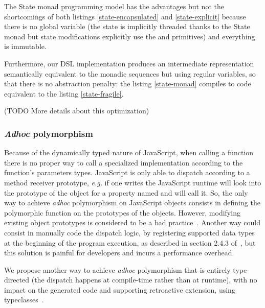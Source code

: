 \documentclass[american,english,runningheads]{llncs}
\newcommand{\eg}{\emph{e.g.}}
\begin{document}
The State monad programming model has the advantages but not the shortcomings of both listings \ref{state-encapsulated} and \ref{state-explicit} because there is no global variable (the state is implicitly threaded thanks to the State monad but state modifications explicitly use the  and  primitives) and everything is immutable.

Furthermore, our DSL implementation produces an intermediate representation semantically equivalent to the monadic sequences but using regular variables, so that there is no abstraction penalty: the listing \ref{state-monad} compiles to code equivalent to the listing \ref{state-fragile}.

(TODO More details about this optimization)

\subsubsection{\emph{Adhoc} polymorphism}

Because of the dynamically typed nature of JavaScript, when calling a function there is no proper way to call a specialized implementation according to the function’s parameters types. JavaScript is only able to dispatch according to a method receiver prototype, \eg{} if one writes  the JavaScript runtime will look into the prototype of the  object for a property named  and will call it. So, the only way to achieve \emph{adhoc} polymorphism on JavaScript objects consists in defining the polymorphic function on the prototypes of the objects. However, modifying existing object prototypes is considered to be a bad practice~\cite{Zakas12_MaintainableJs}. Another way could consist in manually code the dispatch logic, by registering supported data types at the beginning of the program execution, as described in section 2.4.3 of~\cite{Abelson83_SICP}, but this solution is painful for developers and incurs a performance overhead.

We propose another way to achieve \emph{adhoc} polymorphism that is entirely type-directed (the dispatch happens at compile-time rather than at runtime), with no impact on the generated code and supporting retroactive extension, using typeclasses~\cite{Wadler89_AdhocPolymorphism,Odersky06_Typeclasses,Oliveira10_Typeclasses}.
\end{document}
